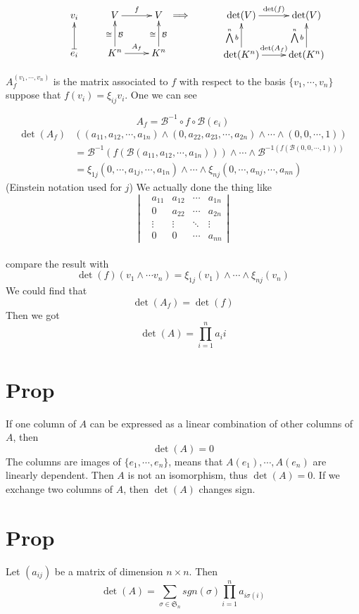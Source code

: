\documentclass{book}
\begin{document}
$$\xymatrix{
    &v_i &V\ar[r]^f &V \\
    &e_i\ar@{|->}[u] &K^n\ar[u]_{\mathcal{B}}^\cong \ar[r]^{A_f} &K^n\ar[u]^\cong_{\mathcal{B}}
}
\Longrightarrow
\xymatrix{
    &\det(V)\ar[r]^{\det(f)} &\det(V)\\
    &\det(K^n)\ar[u]^{\bigwedge\limits^nb}\ar[r]^{\det(A_f)} &\det(K^n)\ar[u]^{\bigwedge\limits^nb}
}
$$ 

$A_f^{(v_1,\cdots,v_n)}$ is the matrix associated to $f$ with respect to the basis $\{v_1,\cdots,v_n\}$
suppose that $f(v_i)=\xi_{ij}v_i$. One we can see

$$A_f=\mathcal{B}^{-1}\circ f\circ\mathcal{B}(e_i)$$
$$\begin{aligned}
    \det (A_f) &((a_{11},a_{12},\cdots,a_{1n})\wedge(0,a_{22},a_{23},\cdots,a_{2n})\wedge\cdots\wedge(0,0,\cdots,1))
    \\ &=\mathcal{B}^{-1}(f(\mathcal{B}(a_{11},a_{12},\cdots,a_{1n})))\wedge\cdots\wedge\mathcal{B}^{-1(f(\mathcal{B}(0,0,\cdots,1)))}\\
    &=\xi_{1j}(0,\cdots,a_{1j},\cdots,a_{1n})\wedge\cdots\wedge\xi_{nj}(0,\cdots,a_{nj},\cdots,a_{nn})
\end{aligned}$$
(Einstein notation used for $j$)
We actually done the thing like
$$\left\lvert\begin{aligned}
    &a_{11}&a_{12}&\cdots&a_{1n}\\
    &0&a_{22}&\cdots&a_{2n}\\
    &\vdots&\vdots&\ddots&\vdots\\
    &0&0&\cdots&a_{nn}
\end{aligned}\right\rvert$$
\\compare the result with 
$$\det(f)(v_1\wedge\cdots v_n)=\xi_{1j}(v_1)\wedge\cdots\wedge\xi_{nj}(v_n)$$
We could find that $$\det(A_f)=\det(f)$$
Then we got $$\det(A)=\prod\limits_{i=1}^na_ii$$
\section{Prop}
If one column of $A$ can be expressed as a linear combination of other columns of $A$, then $$\det(A)=0$$
The columns are images of $\{e_1,\cdots,e_n\}$, means that $A(e_1),\cdots,A(e_n)$ are linearly dependent. Then $A$ is not an isomorphism, thus $\det(A)=0$.
If we exchange two columns of $A$, then $\det(A)$ changes sign.
\section{Prop}
Let $(a_{ij})$ be a matrix of dimension $n\times n$. Then $$\det(A)=\sum\limits_{\sigma\in\mathfrak{S}_n}sgn(\sigma)\prod\limits_{i=1}^na_{i\sigma(i)}$$
\end{document}
